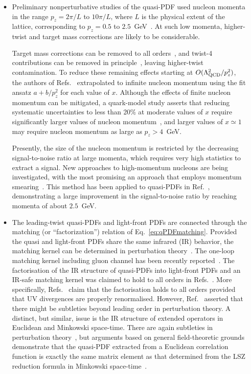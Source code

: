\begin{itemize}
 \item Preliminary nonperturbative studies of the quasi-PDF used nucleon momenta in the range $p_z = 2\pi/L$ to $10\pi/L$, where $L$ is the physical extent of the lattice, corresponding to $p_z = 0.5$ to $2.5$~GeV~\cite{Lin:2014zya,Alexandrou:2015rja,Chen:2016utp,Alexandrou:2016jqi}. At such low momenta, higher-twist and target mass corrections are likely to be considerable.

Target mass corrections can be removed to all orders~\cite{Chen:2016utp}, and twist-4 contributions can be removed in principle~\cite{Chen:2016utp,Radyushkin:2016hsy}, leaving higher-twist contamination. To reduce these remaining effects starting at $O(\Lambda_{\rm QCD}^2/p_z^2)$, the authors of Refs.~\cite{Lin:2014zya,Chen:2016utp} extrapolated to infinite nucleon momentum using the fit ansatz $a + b/p_z^2$ for each value of $x$. Although the effects of finite nucleon momentum can be mitigated, a quark-model study asserts that reducing systematic uncertainties to less than 20\% at moderate values of $x$ require significantly larger values of nucleon momentum~\cite{Gamberg:2014zwa}, and larger values of $x\simeq 1$ may require nucleon momentum as large as $p_z > 4$~GeV.

Presently, the size of the nucleon momentum is restricted by the decreasing signal-to-noise ratio at large momenta, which requires very high statistics to extract a signal. New approaches to high-momentum nucleons are being investigated, with the most promising an approach that employs momentum smearing~\cite{Bali:2016lva}. This method has been applied to quasi-PDFs in Ref.~\cite{Alexandrou:2016jqi,Green:2017xeu}, demonstrating a large improvement in the signal-to-noise ratio by reaching momenta of about $2.5$~GeV.

\item The leading-twist quasi-PDFs and light-front PDFs are connected through the matching (or ``factorization'') relation of Eq.~\eqref{eq:qPDFmatching}. Provided the quasi and light-front PDFs share the same infrared (IR) behavior, the matching kernel can be determined in perturbation theory~\cite{Xiong:2013bka}. 
%
The one-loop matching kernel including gluon channel has been recently 
reported~\cite{Wang:2017qyg}.
%
The factorisation of the IR structure of quasi-PDFs into light-front PDFs and an IR-safe matching kernel was claimed to hold to all orders in Refs.~\cite{Ma:2014jla,Ma:2014jga,Ma:2017pxb}.
%
More specifically, Refs.~\cite{Ma:2014jla,Ma:2014jga} 
claim that the factorisation holds to all orders provided that UV divergences 
are properly renormalised.
%
However, Ref.~\cite{Li:2016amo} asserted that there might be subtleties beyond leading order in perturbation theory. A distinct, but similar, issue is the IR structure of extended operators in Euclidean and Minkowski space-time. There are again subtleties in perturbation theory~\cite{Carlson:2017gpk}, but arguments based on general field-theoretic grounds demonstrate that the quasi-PDF extracted from a Euclidean correlation function is exactly the same matrix element as that determined from the LSZ reduction formula in Minkowski space-time~\cite{Briceno:2017cpo}.


\end{itemize}
